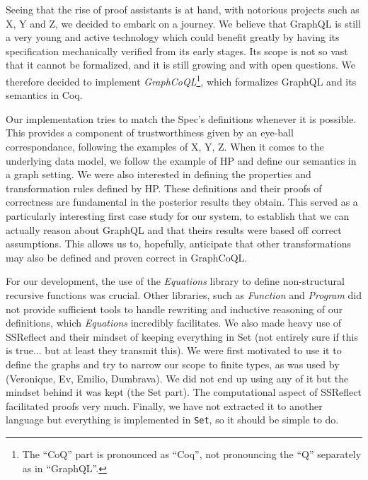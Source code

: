 Seeing that the rise of proof assistants is at hand, with notorious projects such as X, Y and Z, we decided to embark on a journey. We believe that GraphQL is still a very young and active technology which could benefit greatly by having its specification mechanically verified from its early stages. Its scope is not so vast that it cannot be formalized, and it is still growing and with open questions. We therefore decided to implement \textit{GraphCoQL}\footnote{The ``CoQ'' part is pronounced as ``Coq'', not pronouncing the ``Q'' separately as in ``GraphQL''.}, which formalizes GraphQL and its semantics in Coq. 

Our implementation tries to match the Spec's definitions whenever it is possible. This provides a component of trustworthiness given by an eye-ball correspondance, following the examples of X, Y, Z. When it comes to the underlying data model, we follow the example of HP and define our semantics in a graph setting. We were also interested in defining the properties and transformation rules defined by HP. These definitions and their proofs of correctness are fundamental in the posterior results they obtain. This served as a particularly interesting first case study for our system, to establish that we can actually reason about GraphQL and that theirs results were based off correct assumptions. This allows us to, hopefully, anticipate that other transformations may also be defined and proven correct in GraphCoQL.

For our development, the use of the \textit{Equations} library to define non-structural recursive functions was crucial. Other libraries, such as \textit{Function} and \textit{Program} did not provide sufficient tools to handle rewriting and inductive reasoning of our definitions, which \textit{Equations} incredibly facilitates. We also made heavy use of SSReflect and their mindset of keeping everything in Set (not entirely sure if this is true...  but at least they transmit this). We were first motivated to use it to define the graphs and try to narrow our scope to finite types, as was used by (Veronique, Ev, Emilio, Dumbrava). We did not  end up using any of it but the mindset behind it was kept (the Set part). The computational aspect of SSReflect facilitated proofs very much.
Finally, we have not extracted it to another language but everything is implemented in \texttt{Set}, so it should be simple to do.

